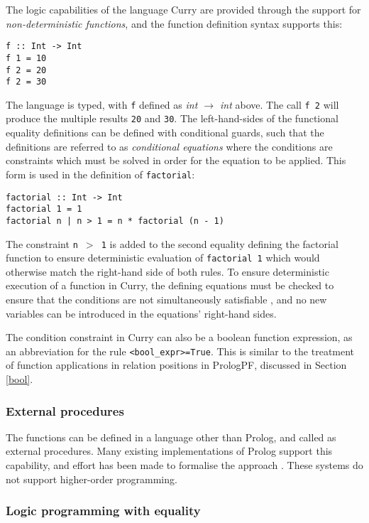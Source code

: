 The logic capabilities of the language Curry \cite{HAK+97} are provided
through the support for \textit{non-deterministic functions}, and the
function definition syntax supports this:
\begin{verbatim}
f :: Int -> Int
f 1 = 10
f 2 = 20
f 2 = 30
\end{verbatim}
The language is typed, with \texttt{f} defined as
\textit{int $\rightarrow$ int} above.  The call \texttt{f 2} will
produce the multiple results \texttt{20} and \texttt{30}.
The left-hand-sides of the functional equality definitions can be
defined with conditional guards, such that the definitions are
referred to as \textit{conditional equations} where the conditions are
constraints which must be solved in order for the equation to be applied.
This form is used in the definition of \texttt{factorial}:
\begin{verbatim}
factorial :: Int -> Int
factorial 1 = 1
factorial n | n > 1 = n * factorial (n - 1)
\end{verbatim}
The constraint \texttt{n $>$ 1} is added to the second equality defining
the factorial function to ensure deterministic evaluation of 
\texttt{factorial 1} which would otherwise match the right-hand side of both rules.
To ensure deterministic execution of a function in Curry, the defining
equations
must be checked to ensure that the conditions are not simultaneously
satisfiable \cite{MNRA92}, and no new variables can be introduced
in the equations' right-hand sides.

The condition constraint in Curry can also be a boolean function
expression, as an abbreviation for the rule \texttt{<bool\_{}expr>=True}.
This is similar to the treatment of function applications
in relation positions in PrologPF, discussed in Section \ref{bool}.

\subsubsection{External procedures}

The functions can be defined in a language other than Prolog, and
called as external procedures.  Many existing implementations of Prolog
support this capability, and effort has been made to formalise the
approach \cite{BM88, MBB+93, Bon92}.  These systems do not support 
higher-order programming.

\subsubsection{Logic programming with equality}

